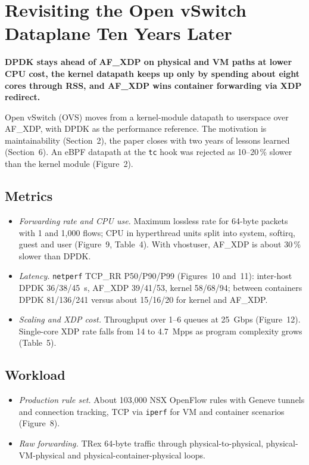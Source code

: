 \documentclass[11pt,a4paper]{article}
\newcommand{\finding}[1]{\textbf{#1}\par\smallskip}
\begin{document}
\section*{\large\normalfont Revisiting the Open vSwitch Dataplane Ten Years Later~\cite{tu2021}}
\finding{DPDK stays ahead of AF\_XDP on physical and VM paths at lower CPU cost, the kernel datapath keeps up only by spending about eight cores through RSS, and AF\_XDP wins container forwarding via XDP redirect.}
Open vSwitch (OVS) moves from a kernel-module datapath to userspace over AF\_XDP, with DPDK as the performance reference.
The motivation is maintainability (Section~2), the paper closes with two years of lessons learned (Section~6).
An eBPF datapath at the \texttt{tc} hook was rejected as 10--20\,\% slower than the kernel module (Figure~2).

\subsection*{\normalsize\normalfont Metrics}
\begin{itemize}
\setlength{\itemsep}{2pt}
\item \emph{Forwarding rate and CPU use.}
Maximum lossless rate for 64-byte packets with 1 and 1,000 flows; CPU in hyperthread units split into system, softirq, guest and user (Figure~9, Table~4).
With vhostuser, AF\_XDP is about 30\,\% slower than DPDK.
\item \emph{Latency.}
\texttt{netperf} TCP\_RR P50/P90/P99 (Figures~10 and~11): inter-host DPDK 36/38/45~\textmu s, AF\_XDP 39/41/53, kernel 58/68/94; between containers DPDK 81/136/241 versus about 15/16/20 for kernel and AF\_XDP.
\item \emph{Scaling and XDP cost.}
Throughput over 1--6 queues at 25~Gbps (Figure~12).
Single-core XDP rate falls from 14 to 4.7~Mpps as program complexity grows (Table~5).
\end{itemize}

\subsection*{\normalsize\normalfont Workload}
\begin{itemize}
\setlength{\itemsep}{2pt}
\item \emph{Production rule set.}
About 103,000 NSX OpenFlow rules with Geneve tunnels and connection tracking, TCP via \texttt{iperf} for VM and container scenarios (Figure~8).
\item \emph{Raw forwarding.}
TRex 64-byte traffic through physical-to-physical, physical-VM-physical and physical-container-physical loops.
\end{itemize}
\end{document}

